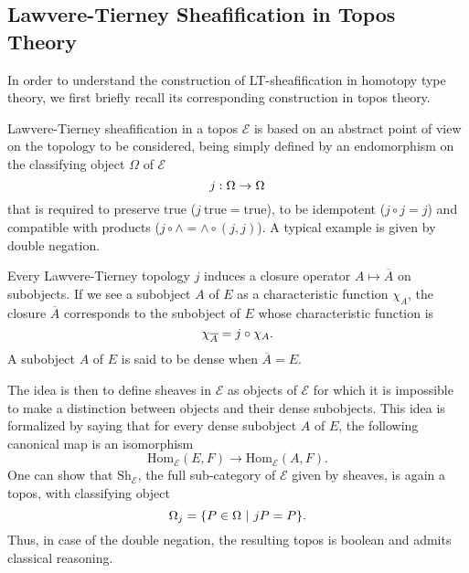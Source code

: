 \documentclass[preprint,9pt,numbers]{sigplanconf}
\newcommand \True {\mathrm{true}}
\newcommand \closure[1] {\overline{#1}}
\newcommand \Char[1] {\chi_{#1}}%
\newcommand \E {\mathcal{E}}
\newcommand \Hom[1] {\mathrm{Hom}_{#1}}
\newcommand \Sh[1] {\mathrm{Sh}_{#1}}
\newenvironment{mymath}[1][-0em]{%
  \newcommand\mymathaux{\vspace{#1}}%
  \vspace{#1}%
  \begin{equation*}%
  }{ %
    \mymathaux%
  \end{equation*}}
\begin{document}
\subsection{Lawvere-Tierney Sheafification in Topos Theory}
\label{sec:lawv-tiern-sheaf}

In order to understand the construction of LT-sheafification in homotopy
type theory, we first briefly recall its corresponding construction in
topos theory. 

Lawvere-Tierney sheafification in a topos $\E$ is based on an abstract
point of view on the topology to be considered, being simply defined by an
endomorphism on the classifying object $\Omega$ of $\E$  
%
\begin{mymath}
j : \Omega \rightarrow \Omega
\end{mymath}%
%
that is required to preserve $\True$ ($j \ \True = \True$), to be
idempotent ($j \circ j = j$) and compatible with products ($j \circ
\wedge = \wedge \circ (j, j)$).
%
A typical example is given by double negation.

Every Lawvere-Tierney topology $j$ induces a closure operator
$A \mapsto \closure{A}$ on subobjects. If we see a subobject $A$ of $E$
as a characteristic function $\Char{A}$, the closure $\closure{A}$
corresponds to the subobject of $E$ whose characteristic function is 
%
\begin{mymath}
\Char{\closure{A}} = j \circ \Char{A}.
\end{mymath}%
%
A subobject $A$ of $E$ is said to
be dense when $\closure{A} = E$.

The idea is then to define sheaves in $\E$ as objects of $\E$ for
which it is impossible to make a distinction between objects and their
dense subobjects. This idea is formalized by saying that for every
dense subobject $A$ of $E$, the following canonical map is an
isomorphism
%
\begin{equation}\label{equ:sheaf_def}
\Hom{\E}(E,F) \rightarrow \Hom{\E}(A,F).
\end{equation}%
%
One can show that $\Sh{\E}$, the full sub-category of $\E$ given by
sheaves, is again a topos, with classifying object
%
\begin{mymath}
\Omega_j = \{ P \in \Omega \ | \ j P  = P \}.
\end{mymath}%
%
Thus, in case of the double negation, the resulting topos is boolean  
and admits classical reasoning.
\end{document}
